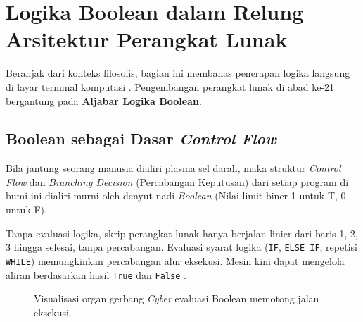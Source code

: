 \section{Logika Boolean dalam Relung Arsitektur Perangkat Lunak}

Beranjak dari konteks filosofis, bagian ini membahas penerapan logika langsung di layar terminal komputasi \cite{levin_discrete,saylor_cs202}. Pengembangan perangkat lunak di abad ke-21 bergantung pada \textbf{Aljabar Logika Boolean}.

\subsection{Boolean sebagai Dasar \textit{Control Flow}}

Bila jantung seorang manusia dialiri plasma sel darah, maka struktur \textit{Control Flow} dan \textit{Branching Decision} (Percabangan Keputusan) dari setiap program di bumi ini dialiri murni oleh denyut nadi \textit{Boolean} (Nilai limit biner 1 untuk T, 0 untuk F). 

Tanpa evaluasi logika, skrip perangkat lunak hanya berjalan linier dari baris 1, 2, 3 hingga selesai, tanpa percabangan. Evaluasi syarat logika (\texttt{IF}, \texttt{ELSE IF}, repetisi \texttt{WHILE}) memungkinkan percabangan alur eksekusi. Mesin kini dapat mengelola aliran berdasarkan hasil \texttt{True} dan \texttt{False} \cite{levin_discrete}.

\begin{figure}[htbp]
\centering
{}
\caption{Visualisasi organ gerbang \textit{Cyber} evaluasi Boolean memotong jalan eksekusi.}
\label{fig:alur-boolean}
\end{figure}

